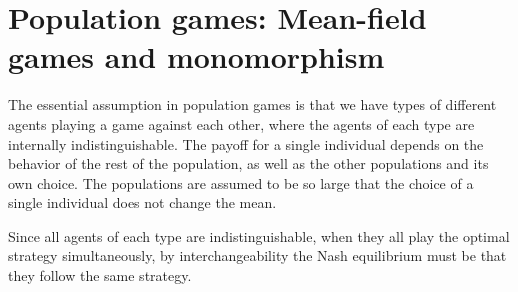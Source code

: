
\section*{Population games: Mean-field games and monomorphism}


The essential assumption in population games is that we have  types of different agents playing a game against each other, where the agents of each type are internally indistinguishable. The payoff for a single individual depends on the behavior of the rest of the population, as well as the other populations and its own choice. The populations are assumed to be so large that the choice of a single individual does not change the mean.

Since all agents of each type are indistinguishable, when they all play the optimal strategy simultaneously, by interchangeability the Nash equilibrium must be that they follow the same strategy.

